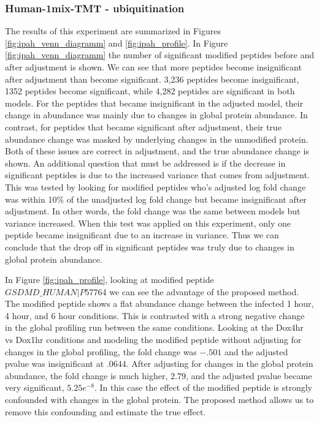 \documentclass[mcp]{article}
\numberwithin{figure}{section} %
\numberwithin{table}{section}
\begin{document}
\subsubsection*{Human-1mix-TMT - ubiquitination}

The results of this experiment are summarized in Figures \ref{fig:ipah_venn_diagramm} and \ref{fig:ipah_profile}. In Figure \ref{fig:ipah_venn_diagramm} the number of significant modified peptides before and after adjustment is shown. We can see that more peptides become insignificant after adjustment than become significant. 3,236 peptides become insignificant, 1352 peptides become significant, while 4,282 peptides are significant in both models. For the peptides that became insignificant in the adjusted model, their change in abundance was mainly due to changes in global protein abundance. In contrast, for peptides that became significant after adjustment, their true abundance change was masked by underlying changes in the unmodified protein. Both of these issues are correct in adjustment, and the true abundance change is shown. An additional question that must be addressed is if the decrease in significant peptides is due to the increased variance that comes from adjustment. This was tested by looking for modified peptides who's adjusted log fold change was within 10\% of the unadjusted log fold change but became insignificant after adjustment. In other words, the fold change was the same between models but variance increased. When this test was applied on this experiment, only one peptide became insignificant due to an increase in variance. Thus we can conclude that the drop off in significant peptides was truly due to changes in global protein abundance.

In Figure \ref{fig:ipah_profile}, looking at modified peptide $GSDMD\_HUMAN|P57764$ we can see the advantage of the proposed method. The modified peptide shows a flat abundance change between the infected 1 hour, 4 hour, and 6 hour conditions. This is contrasted with a strong negative change in the global profiling run between the same conditions. Looking at the Dox4hr vs Dox1hr conditions and modeling the modified peptide without adjusting for changes in the global profiling, the fold change was $-.501$ and the adjusted pvalue was insignificant at $.0644$. After adjusting for changes in the global protein abundance, the fold change is much higher, $2.79$, and the adjusted pvalue became very significant, $5.25e^{-8}$. In this case the effect of the modified peptide is strongly confounded with changes in the global protein. The proposed method allows us to remove this confounding and estimate the true effect. 
\end{document}
